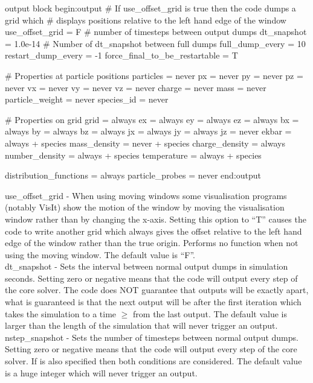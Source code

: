 \begin{lboxverbatim}{output block}
begin:output
   # If use_offset_grid is true then the code dumps a grid which
   # displays positions relative to the left hand edge of the window
   use_offset_grid = F
   # number of timesteps between output dumps
   dt_snapshot = 1.0e-14
   # Number of dt_snapshot between full dumps
   full_dump_every = 10
   restart_dump_every = -1
   force_final_to_be_restartable = T

   # Properties at particle positions
   particles = never
   px = never
   py = never
   pz = never
   vx = never
   vy = never
   vz = never
   charge = never
   mass = never
   particle_weight = never
   species_id = never

   # Properties on grid
   grid = always
   ex = always
   ey = always
   ez = always
   bx = always
   by = always
   bz = always
   jx = always
   jy = always
   jz = never
   ekbar = always + species
   mass_density = never + species
   charge_density = always
   number_density = always + species
   temperature = always + species

   distribution_functions = always
   particle_probes = never
end:output
\end{lboxverbatim}

{\emphtext use\_offset\_grid} - When using moving windows some visualisation
programs (notably VisIt) show the motion of the window by moving the
visualisation window rather than by changing the x-axis. Setting this option to
``T'' causes the code to write another grid which always gives the offset
relative to the left hand edge of the window rather than the true origin.
Performs no function when not using the moving window. The default value
is ``F''.\\

{\emphtext dt\_snapshot} - Sets the interval between normal output dumps in
simulation seconds. Setting zero or negative means that the code will output
every step of the core solver. The code does NOT guarantee that outputs will be
exactly  apart, what is guaranteed is that the next
output will be after the first iteration which takes the simulation to a time
$\ge$  from the last output. The default value is
larger than the length of the simulation that will never trigger an output.\\

{\emphtext nstep\_snapshot} - Sets the number of timesteps between normal
output dumps. Setting zero or negative means that the code will output
every step of the core solver. If  is also specified
then both conditions are considered. The default value is a huge integer
which will never trigger an output.\\

